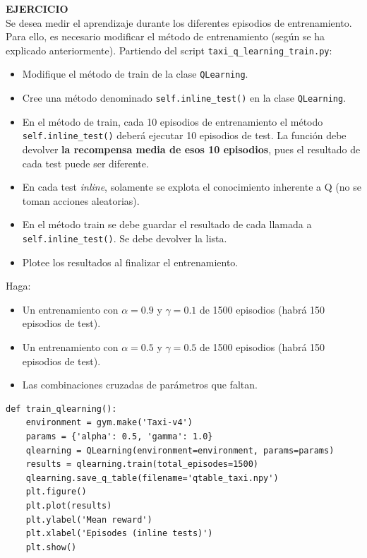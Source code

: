 \documentclass{article}
\begin{document}
 
\begin{exercise}
\textbf{EJERCICIO}\\
Se desea medir el aprendizaje durante los diferentes episodios de entrenamiento. Para ello, es necesario modificar el método de entrenamiento (según se ha explicado anteriormente). Partiendo del script \texttt{taxi\_q\_learning\_train.py}: 
\begin{itemize}
    \item Modifique el método de train de la clase \texttt{QLearning}.
    \item Cree una método denominado \texttt{self.inline\_test()} en la clase \texttt{QLearning}. 
    \item En el método de train, cada 10 episodios de entrenamiento el método \texttt{self.inline\_test()} deberá ejecutar 10 episodios de test. La función debe devolver \textbf{la recompensa media de esos 10 episodios}, pues el resultado de cada test puede ser diferente.
    \item En cada test \textit{inline}, solamente se explota el conocimiento inherente a Q (no se toman acciones aleatorias).
    \item En el método train se debe guardar el resultado de cada llamada a \texttt{self.inline\_test()}. Se debe devolver la lista.
     \item Plotee los resultados al finalizar el entrenamiento.
\end{itemize}
Haga:
\begin{itemize}
    \item Un entrenamiento con $\alpha=0.9$ y $\gamma=0.1$ de 1500 episodios (habrá 150 episodios de test).
    \item Un entrenamiento con $\alpha=0.5$ y $\gamma=0.5$ de 1500 episodios (habrá 150 episodios de test).    
    \item Las combinaciones cruzadas de parámetros que faltan.
\end{itemize}
\begin{verbatim}
def train_qlearning():
    environment = gym.make('Taxi-v4')
    params = {'alpha': 0.5, 'gamma': 1.0}
    qlearning = QLearning(environment=environment, params=params)
    results = qlearning.train(total_episodes=1500)
    qlearning.save_q_table(filename='qtable_taxi.npy')
    plt.figure()
    plt.plot(results)
    plt.ylabel('Mean reward')
    plt.xlabel('Episodes (inline tests)')
    plt.show()
\end{verbatim}
\end{exercise}
\end{document}
